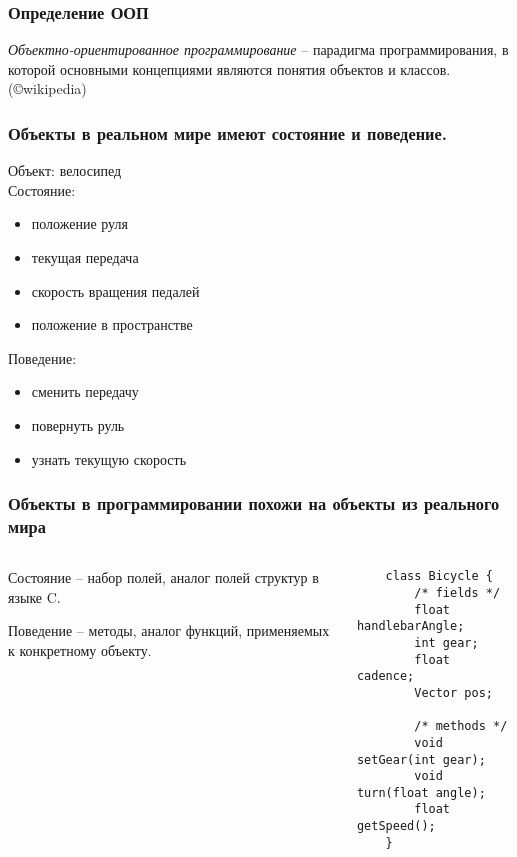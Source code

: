 \begin{frame}
	\frametitle{Определение ООП}

	\begin{large}
	\emph{Объектно-ориентированное программирование} -- парадигма программирования, в которой основными концепциями являются понятия объектов и классов. (©wikipedia)
	\end{large}
\end{frame}

\begin{frame}
	\frametitle{Объекты в реальном мире имеют состояние и поведение.}

	Объект: велосипед\\
	Состояние:
	\begin{itemize}
		\item{положение руля}
		\item{текущая передача}
		\item{скорость вращения педалей}
		\item{положение в пространстве}
	\end{itemize}
	Поведение:
	\begin{itemize}
		\item{сменить передачу}
		\item{повернуть руль}
		\item{узнать текущую скорость}
	\end{itemize}
\end{frame}

\begin{frame}[fragile]
	\frametitle{Объекты в программировании похожи на объекты из реального мира}

	\begin{columns}[c]
	\column{2.1in}
	\begin{large}
	Состояние -- набор полей, аналог полей структур в языке C.

	\medskip
	Поведение -- методы, аналог функций, применяемых к конкретному объекту.
	\end{large}
	\column{2.3in}
	\begin{verbatim}
	class Bicycle {
	    /* fields */
	    float handlebarAngle;
	    int gear;
	    float cadence;
	    Vector pos;

	    /* methods */
	    void setGear(int gear);
	    void turn(float angle);
	    float getSpeed();
	}
	\end{verbatim}
	\end{columns}
\end{frame}

